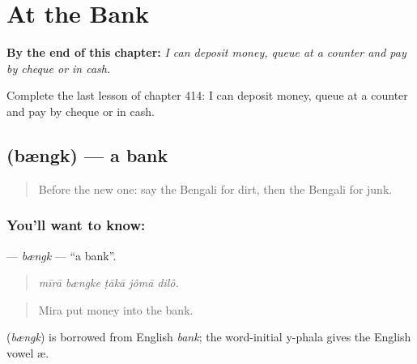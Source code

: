 
\chapter{At the Bank}
\label{ch:bn-at-the-bank}

\begin{chapteropening}
\textbf{By the end of this chapter:} \emph{I can deposit money, queue at a counter and pay by cheque or in cash.}

Complete the last lesson of chapter 414: I can deposit money, queue at a counter and pay by cheque or in cash.
\end{chapteropening}

\section[\texorpdfstring{\bn{ব্যাংক} (bængk)}{ব্যাংক (bængk)}]{ (bængk) — a bank}

\label{lesson:BN-C414-bengk}



\begin{quote}
Before the new one: say the Bengali for dirt, then the Bengali for junk.
\end{quote}

\subsection*{You'll want to know: }
\textbf{} — \emph{bængk} — \textquotedblleft{}a bank\textquotedblright{}.

\begin{quote}
    
\end{quote}

\begin{quote}
\emph{mīrā bængke ṭākā jômā dilô.}
\end{quote}

\begin{quote}
Mira put money into the bank.
\end{quote}

\begin{cousinweb}
\textbf{} (\emph{bængk}) is borrowed from English \emph{bank}; the word-initial y-phala gives the English vowel æ.
\end{cousinweb}

